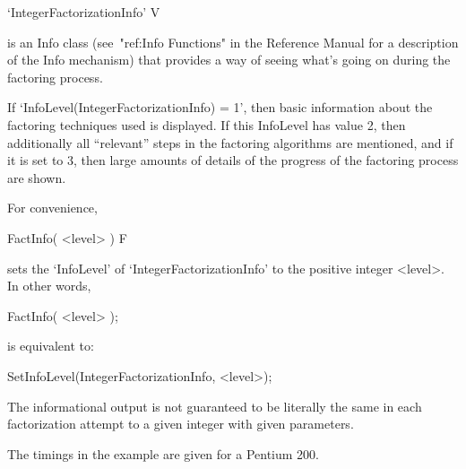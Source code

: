 

\>`IntegerFactorizationInfo' V

is an Info class (see~"ref:Info Functions" in the {\GAP} Reference Manual
for a description of the Info mechanism) that provides a way of seeing
what's going on during the factoring process.

If `InfoLevel(IntegerFactorizationInfo) = 1', then basic information
about the factoring techniques used is displayed. If this InfoLevel has
value 2, then additionally all ``relevant'' steps in the factoring
algorithms are mentioned, and if it is set to 3, then large amounts of
details of the progress of the factoring process are shown. 

For convenience,

\>FactInfo( <level> ) F

sets the `InfoLevel' of `IntegerFactorizationInfo' to the positive integer
<level>. In other words,

FactInfo( <level> );

is equivalent to:

SetInfoLevel(IntegerFactorizationInfo, <level>);

The informational output is not guaranteed to be literally the same in
each factorization attempt to a given integer with given parameters.

The timings in the example are given for a Pentium 200.

